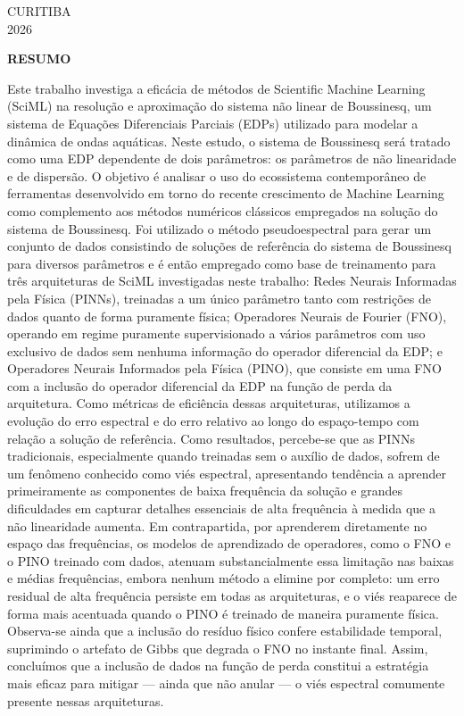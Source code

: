 \vfill
\begin{center}
CURITIBA \\
2026
\end{center}
\pagebreak

\begin{center}
\textbf{RESUMO}
\end{center}
\noindent Este trabalho investiga a eficácia de métodos de Scientific Machine Learning (SciML) 
  na resolução e aproximação do sistema não linear de Boussinesq, um sistema de Equações Diferenciais Parciais (EDPs) 
  utilizado para modelar a dinâmica de ondas aquáticas. Neste estudo, o sistema de Boussinesq será tratado como uma 
  EDP dependente de dois parâmetros: os parâmetros de não linearidade e de dispersão. O objetivo é analisar o uso do 
  ecossistema contemporâneo de ferramentas desenvolvido em torno do recente crescimento de Machine Learning como 
  complemento aos métodos numéricos clássicos empregados na solução do sistema de Boussinesq. Foi utilizado o método 
  pseudoespectral para gerar um conjunto de dados consistindo de soluções de referência do sistema de Boussinesq para 
  diversos parâmetros e é então empregado como base de treinamento para três arquiteturas de SciML investigadas neste trabalho: 
  Redes Neurais Informadas pela Física (PINNs), treinadas a um único parâmetro tanto com restrições de dados quanto de forma puramente física; 
  Operadores Neurais de Fourier (FNO), operando em regime puramente supervisionado a vários parâmetros com uso exclusivo de dados sem nenhuma 
  informação do operador diferencial da EDP; e Operadores Neurais Informados pela Física (PINO), que consiste em uma FNO 
  com a inclusão do operador diferencial da EDP na função de perda da arquitetura. Como métricas de eficiência dessas 
  arquiteturas, utilizamos a evolução do erro espectral e do erro relativo ao longo do espaço-tempo com relação a solução 
  de referência. Como resultados, percebe-se que as PINNs tradicionais, especialmente quando treinadas sem o auxílio de dados, 
  sofrem de um fenômeno conhecido como viés espectral, apresentando tendência a aprender primeiramente as componentes de 
  baixa frequência da solução e grandes dificuldades em capturar detalhes essenciais de alta frequência à medida que a 
  não linearidade aumenta. Em contrapartida, por aprenderem diretamente no espaço das frequências, os modelos de
  aprendizado de operadores, como o FNO e o PINO treinado com dados, atenuam substancialmente essa limitação nas baixas e
  médias frequências, embora nenhum método a elimine por completo: um erro residual de alta frequência persiste em todas as
  arquiteturas, e o viés reaparece de forma mais acentuada quando o PINO é treinado de maneira puramente física. Observa-se
  ainda que a inclusão do resíduo físico confere estabilidade temporal, suprimindo o artefato de Gibbs que degrada o FNO no
  instante final. Assim, concluímos que a inclusão de dados na função de perda constitui a estratégia mais eficaz para
  mitigar --- ainda que não anular --- o viés espectral comumente presente nessas arquiteturas.

